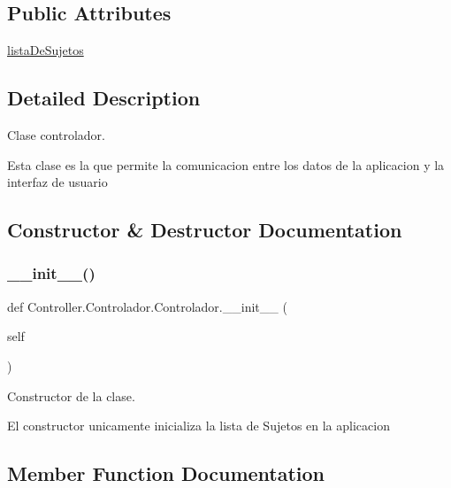 \subsection*{Public Attributes}
\begin{DoxyCompactItemize}
\item 
\hyperlink{class_controller_1_1_controlador_1_1_controlador_ac7f14b4e1c0f2bf39ef0ddf2ae687898}{lista\+De\+Sujetos}
\end{DoxyCompactItemize}


\subsection{Detailed Description}
Clase controlador. 

Esta clase es la que permite la comunicacion entre los datos de la aplicacion y la interfaz de usuario 

\subsection{Constructor \& Destructor Documentation}
\mbox{\label{class_controller_1_1_controlador_1_1_controlador_ad30f895c86fb2085fbd3b2c0a1c9f38c}} 
\subsubsection{\texorpdfstring{\+\_\+\+\_\+init\+\_\+\+\_\+()}{\_\_init\_\_()}}
{\footnotesize\ttfamily def Controller.\+Controlador.\+Controlador.\+\_\+\+\_\+init\+\_\+\+\_\+ (\begin{DoxyParamCaption}\item[{}]{self }\end{DoxyParamCaption})}



Constructor de la clase. 

El constructor unicamente inicializa la lista de Sujetos en la aplicacion 

\subsection{Member Function Documentation}
\mbox{\label{class_controller_1_1_controlador_1_1_controlador_a9db63a2076f02aafddb2fb72a61630a2}} 
